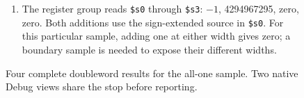 \begin{figure}[htbp]
\begin{minipage}{\linewidth}
\begin{enumerate}
      \item The register group reads \texttt{\$s0} through \texttt{\$s3}: $-1$, 4294967295, zero, zero. Both additions use the sign-extended source in \texttt{\$s0}. For this particular sample, adding one at either width gives zero; a boundary sample is needed to expose their different widths.
    \end{enumerate}
  \end{minipage}
  \caption{Four complete doubleword results for the all-one sample. Two native Debug views share the stop before reporting.}
  \label{capture:004-bit-inspector-f02-result-memory}
\end{figure}
\par
